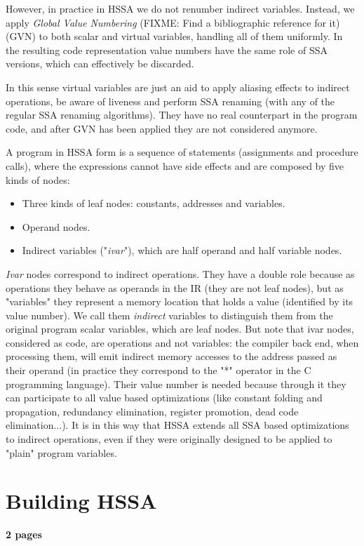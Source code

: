 However, in practice in HSSA we do not renumber indirect variables.
Instead, we apply {\em Global Value Numbering} (FIXME: Find a bibliographic reference for it) (GVN) to both scalar and virtual variables, handling all of them uniformly. In the resulting code representation value numbers have the same role of SSA versions, which can effectively be discarded.

In this sense virtual variables are just an aid to apply aliasing effects to indirect operations, be aware of liveness and perform SSA renaming (with any of the regular SSA renaming algorithms). They have no real counterpart in the program code, and after GVN has been applied they are not considered anymore.

A program in HSSA form is a sequence of statements (assignments and procedure calls), where the expressions cannot have side effects and are composed by five kinds of nodes:
\begin{itemize}
\item Three kinds of leaf nodes: constants, addresses and variables.
\item Operand nodes.
\item Indirect variables ("{\em ivar}"), which are half operand and half variable nodes.
\end{itemize}

{\em Ivar} nodes correspond to indirect operations.
They have a double role because as operations they behave as operands in the IR (they are not leaf nodes), but as "variables" they represent a memory location that holds a value (identified by its value number).
We call them {\em indirect} variables to distinguish them from the original program scalar variables, which are leaf nodes.
But note that ivar nodes, considered as code, are operations and not variables: the compiler back end, when processing them, will emit indirect memory accesses to the address passed as their operand (in practice they correspond to the "*" operator in the C programming language).
Their value number is needed because through it they can participate to all value based optimizations (like constant folding and propagation, redundancy elimination, register promotion, dead code elimination...).
It is in this way that HSSA extends all SSA based optimizations to indirect operations, even if they were originally designed to be applied to "plain" program variables.


\section{Building HSSA}
\textbf{2 pages}

